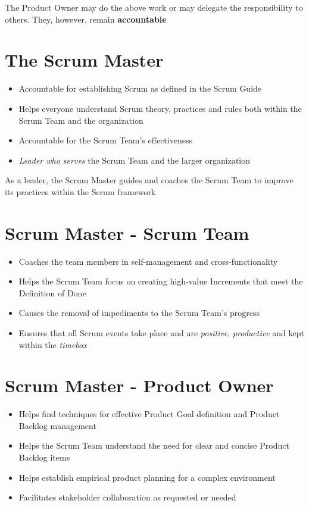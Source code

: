 \documentclass[a4paper,11pt,twocolumn]{article}
\begin{document}
\begin{tcolorbox}[colback=black!8!white,colframe=gray!50!black,title=Note,sharp corners,fonttitle=\normalsize\bfseries,fontupper=\normalsize,left=0.7em,right=0.7em]
	The Product Owner may do the above work or may delegate the responsibility to others. They, however, remain \textbf{accountable}
\end{tcolorbox}

\section*{The Scrum Master}
\begin{itemize}
	\item Accountable for establishing Scrum as defined in the Scrum Guide
	\item Helps everyone understand Scrum theory, practices and rules both within the Scrum Team and the organization
	\item Accountable for the Scrum Team's effectiveness
	\item \textit{Leader who serves} the Scrum Team and the larger organization
\end{itemize}

\begin{tcolorbox}[colback=black!8!white,colframe=gray!50!black,title=Note,sharp corners,fonttitle=\normalsize\bfseries,fontupper=\normalsize,left=0.7em,right=0.7em]
	As a leader, the Scrum Master guides and coaches the Scrum Team to improve its practices within the Scrum framework
\end{tcolorbox}

\section*{Scrum Master - Scrum Team}
\begin{itemize}
	\item Coaches the team members in self-management and cross-functionality
	\item Helps the Scrum Team focus on creating high-value Increments that meet the Definition of Done
	\item Causes the removal of impediments to the Scrum Team's progress
	\item Ensures that all Scrum events take place and are \textit{positive}, \textit{productive} and kept within the \textit{timebox}
\end{itemize}

\section*{Scrum Master - Product Owner}
\begin{itemize}
	\item Helps find techniques for effective Product Goal definition and Product Backlog management
	\item Helps the Scrum Team understand the need for clear and concise Product Backlog items
	\item Helps establish empirical product planning for a complex environment
	\item Facilitates stakeholder collaboration as requested or needed
\end{itemize}
\end{document}
